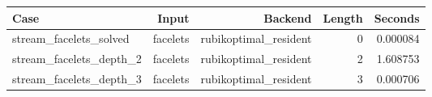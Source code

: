 {\small
\begin{tabular}{lrrrr}
\hline
Case & Input & Backend & Length & Seconds \\
\hline
stream\_facelets\_solved & facelets & rubikoptimal\_resident & 0 & 0.000084 \\
stream\_facelets\_depth\_2 & facelets & rubikoptimal\_resident & 2 & 1.608753 \\
stream\_facelets\_depth\_3 & facelets & rubikoptimal\_resident & 3 & 0.000706 \\
\hline
\end{tabular}
}
